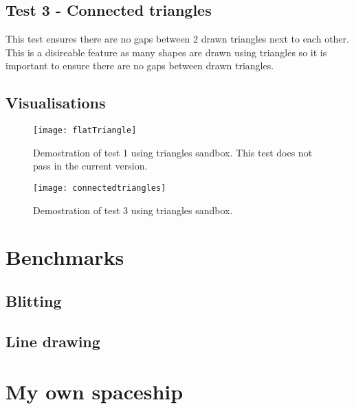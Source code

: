 \documentclass[
	letterpaper, %
	10pt, %
]{CSUniSchoolLabReport}
\begin{document}
\subsection*{Test 3 {-} Connected triangles}
This test ensures there are no gaps between 2 drawn triangles next to each other. This is a disireable
feature as many shapes are drawn using triangles so it is important to ensure there are no gaps 
between drawn triangles.
\subsection*{Visualisations}
\begin{figure}[H]
	\centering
	\begin{minipage}[b]{0.4\textwidth}
		\texttt{[image: flatTriangle]}
		\caption{Demostration of test 1 using triangles sandbox. This test does not pass in the current version.}
	\end{minipage}
	\hfill
	\begin{minipage}[b]{0.4\textwidth}
		\texttt{[image: connectedtriangles]}
		\caption{Demostration of test 3 using triangles sandbox.}
  	\end{minipage}
\end{figure}
\section{Benchmarks}
\subsection{Blitting}

\subsection{Line drawing}

\section{My own spaceship}

\subsection*{}

\printbibliography%

\end{document}

